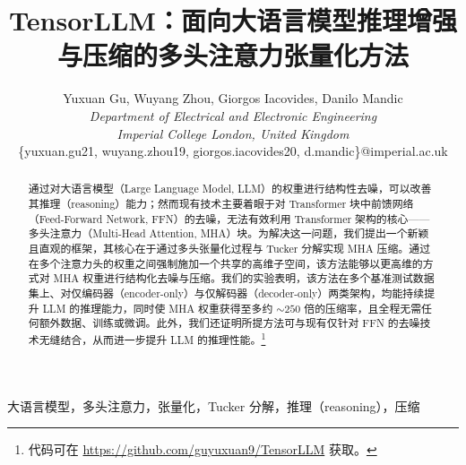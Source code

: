
\title{TensorLLM：面向大语言模型推理增强与压缩的多头注意力张量化方法}

\author{
Yuxuan Gu, Wuyang Zhou, Giorgos Iacovides, Danilo Mandic \\
\textit{Department of Electrical and Electronic Engineering}\\
\textit{Imperial College London, United Kingdom}\\
\{yuxuan.gu21, wuyang.zhou19, giorgos.iacovides20, d.mandic\}@imperial.ac.uk
}

\maketitle

\begin{abstract}
通过对大语言模型（Large Language Model, LLM）的权重进行结构性去噪，可以改善其推理（reasoning）能力；然而现有技术主要着眼于对 Transformer 块中前馈网络（Feed-Forward Network, FFN）的去噪，无法有效利用 Transformer 架构的核心——多头注意力（Multi-Head Attention, MHA）块。为解决这一问题，我们提出一个新颖且直观的框架，其核心在于通过多头张量化过程与 Tucker 分解实现 MHA 压缩。通过在多个注意力头的权重之间强制施加一个共享的高维子空间，该方法能够以更高维的方式对 MHA 权重进行结构化去噪与压缩。我们的实验表明，该方法在多个基准测试数据集上、对仅编码器（encoder-only）与仅解码器（decoder-only）两类架构，均能持续提升 LLM 的推理能力，同时使 MHA 权重获得至多约 $\sim 250$ 倍的压缩率，且全程无需任何额外数据、训练或微调。此外，我们还证明所提方法可与现有仅针对 FFN 的去噪技术无缝结合，从而进一步提升 LLM 的推理性能。\footnote{代码可在 \href{https://github.com/guyuxuan9/TensorLLM}{https://github.com/guyuxuan9/TensorLLM} 获取。}
\end{abstract}

\begin{IEEEkeywords}
大语言模型，多头注意力，张量化，Tucker 分解，推理（reasoning），压缩
\end{IEEEkeywords}
